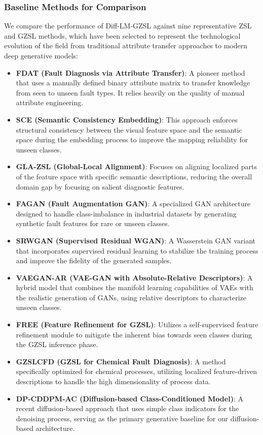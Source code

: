 \subsubsection{Baseline Methods for Comparison}
We compare the performance of Diff-LM-GZSL against nine representative ZSL and GZSL methods, which have been selected to represent the technological evolution of the field from traditional attribute transfer approaches to modern deep generative models:
\begin{itemize}
    \item \textbf{FDAT (Fault Diagnosis via Attribute Transfer)}: A pioneer method that uses a manually defined binary attribute matrix to transfer knowledge from seen to unseen fault types. It relies heavily on the quality of manual attribute engineering.
    \item \textbf{SCE (Semantic Consistency Embedding)}: This approach enforces structural consistency between the visual feature space and the semantic space during the embedding process to improve the mapping reliability for unseen classes.
    \item \textbf{GLA-ZSL (Global-Local Alignment)}: Focuses on aligning localized parts of the feature space with specific semantic descriptions, reducing the overall domain gap by focusing on salient diagnostic features.
    \item \textbf{FAGAN (Fault Augmentation GAN)}: A specialized GAN architecture designed to handle class-imbalance in industrial datasets by generating synthetic fault features for rare or unseen classes.
    \item \textbf{SRWGAN (Supervised Residual WGAN)}: A Wasserstein GAN variant that incorporates supervised residual learning to stabilize the training process and improve the fidelity of the generated samples.
    \item \textbf{VAEGAN-AR (VAE-GAN with Absolute-Relative Descriptors)}: A hybrid model that combines the manifold learning capabilities of VAEs with the realistic generation of GANs, using relative descriptors to characterize unseen classes.
    \item \textbf{FREE (Feature Refinement for GZSL)}: Utilizes a self-supervised feature refinement module to mitigate the inherent bias towards seen classes during the GZSL inference phase.
    \item \textbf{GZSLCFD (GZSL for Chemical Fault Diagnosis)}: A method specifically optimized for chemical processes, utilizing localized feature-driven descriptions to handle the high dimensionality of process data.
    \item \textbf{DP-CDDPM-AC (Diffusion-based Class-Conditioned Model)}: A recent diffusion-based approach that uses simple class indicators for the denoising process, serving as the primary generative baseline for our diffusion-based architecture.
\end{itemize}

